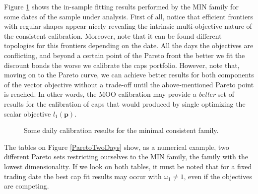 Figure \ref{MCParetoFronts} shows the in-sample fitting results
performed by the MIN family for some dates of the sample under
analysis. First of all, notice that efficient frontiers with regular
shapes appear nicely revealing the intrinsic multi-objective nature of
the consistent calibration. Moreover, note that it can be found different 
topologies for this frontiers depending on the date. All the days the
objectives are conflicting, and beyond a certain point of the Pareto
front the better we fit the discount bonds the worse we calibrate the caps
portfolio. However, note that, moving on to the Pareto curve, we can
achieve better results for both components of the vector objective
without a trade-off until the above-mentioned Pareto point is
reached. In other words, the MOO calibration may provide a {\sl
  better} set of results for the calibration of caps that would
produced by single optimizing the scalar objective $l_1(\boldsymbol
p)$. 

\begin{figure}[h!]
\centering
\caption{Some daily calibration results for the minimal consistent
  family.\label{MCParetoFronts}}
\end{figure} The tables on Figure \ref{ParetoTwoDays} show,
as a numerical example, two different Pareto sets restricting
ourselves to the MIN family, the family with the lowest
dimensionality. If we look on both tables, it must be noted that for a
fixed trading date the best cap fit results may occur with
$\omega_1\neq 1$, even if the objectives are competing.

